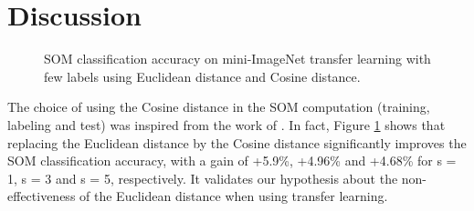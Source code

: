 \documentclass[runningheads]{llncs}
\begin{document}
\section{Discussion}
\label{sec_discussion}

\begin{figure}[h]
	\centerline{}
	\caption{SOM classification accuracy on mini-ImageNet transfer learning with few labels using Euclidean distance and Cosine distance.}
	\label{fig_cosine-distance}
\end{figure}

The choice of using the Cosine distance in the SOM computation (training, labeling and test) was inspired from the work of \cite{hu2020accurate_few_shot}. In fact, Figure \ref{fig_cosine-distance} shows that replacing the Euclidean distance by the Cosine distance significantly improves the SOM classification accuracy, with a gain of +5.9\%, +4.96\% and +4.68\% for s = 1, s = 3 and s = 5, respectively. It validates our hypothesis about the non-effectiveness of the Euclidean distance when using transfer learning.

\begin{table}[h]
\centering
\caption{mini-ImageNet few labels transfer learning with q = 15 (Q = 75): state of the art reported from \cite{hu2020accurate_few_shot}.}
\label{tab_imgnet}
\begin{center}
\end{center}
\end{table}
\end{document}
